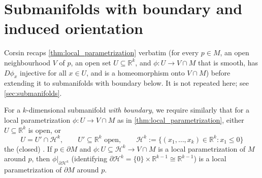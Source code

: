 

\section{Submanifolds with boundary and induced orientation}
\label{sec:submanifolds_with_boundary}

\begin{ainote}
Corsin recaps \cref{thm:local_parametrization} verbatim (for every $p \in M$, an
open neighbourhood $V$ of $p$, an open set $U \subseteq \mathbb{R}^k$, and $\phi : U \to
V\cap M$ that is smooth, has $D\phi_x$ injective for all $x \in U$, and is a homeomorphism onto
$V\cap M$) before extending it to submanifolds with boundary below. It is not repeated here; see
\cref{sec:submanifolds}.
\end{ainote}

\begin{definition}
\label{def:submanifold_with_boundary}
For a $k$-dimensional submanifold \emph{with boundary}, we require similarly that for a local
parametrization $\phi : U \to V\cap M$ as in \cref{thm:local_parametrization}, either $U
\subseteq \mathbb{R}^k$ is open, or
\[U = U' \cap \mathcal{H}^k, \qquad U' \subseteq \mathbb{R}^k \text{ open}, \qquad
  \mathcal{H}^k := \{(x_1,\ldots,x_k) \in \mathbb{R}^k : x_1 \leq 0\}\]
the (closed) . If $p \in \partial M$ and $\phi : U \subseteq
\mathcal{H}^k \to V\cap M$ is a local parametrization of $M$ around $p$, then $\phi|_{\partial
\mathcal{H}^k}$ (identifying $\partial\mathcal{H}^k = \{0\}\times\mathbb{R}^{k-1} \cong
\mathbb{R}^{k-1}$) is a local parametrization of $\partial M$ around $p$.
\end{definition}

